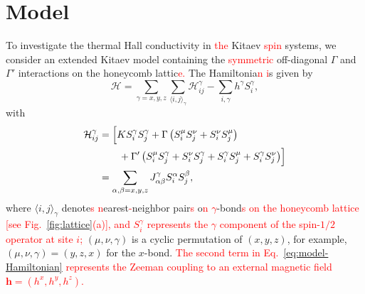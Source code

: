 \documentclass[twocolumn,superscriptaddress,showpacs, longbibliography, aps, prb]{revtex4-2}
\newcommand{\red}[1]{\textcolor{red}{#1}}
\newcommand{\blue}[1]{\textcolor{blue}{#1}}
\newcommand{\orange}[1]{\textcolor{orange}{#1}}
\begin{document}
\section{Model}
\label{sec:model}
To investigate the thermal Hall conductivity %
in \red{the} Kitaev \red{spin} systems, 
we consider an extended Kitaev model containing the \red{symmetric} off-diagonal $\Gamma$ and $\Gamma'$ interactions 
on the honeycomb lattic\red{e.} %
The Hamiltonia\red{n %
i}s given %
by
\begin{equation}
 \mathcal{H} = \sum_{\gamma = x,y,z} \sum_{\langle i,j \rangle_\gamma}\mathcal{H}_{ij}^\gamma -  \sum_{i,\gamma} h^\gamma S_i^\gamma,
 \label{eq:model-Hamiltonian}
\end{equation}
with
\begin{align}
 \mathcal{H}_{ij}^\gamma &= \Bigl[ K S_i^\gamma S_j^\gamma + \Gamma\left( S_i^\mu S_j^\nu + S_i^\nu S_j^\mu \right) \notag\\
&\qquad + \Gamma'\left( S_i^\mu S_j^\gamma + S_i^\nu S_j^\gamma + S_i^\gamma S_j^\mu + S_i^\gamma S_j^\nu \right) \Bigr]\\
&= \sum_{\alpha,\beta = x,y,z} J_{\alpha\beta}^\gamma S_i^\alpha S_j^\beta, 
\end{align}
where $\langle i,j\rangle_\gamma$ %
denote\red{s %
n}earest\red{-}neighbor pair\red{s} o\red{n %
$\gamma$}-bond\red{s on the honeycomb lattice [see Fig.~\ref{fig:lattice}(a)], and $S_i^\gamma$ represents the $\gamma$ component of the spin-$1/2$ operator at site $i$;} %
$(\mu, \nu, \gamma)$ %
is a cyclic permutation of $(x,y,z)$, for example,
$(\mu, \nu, \gamma)=(y,z,x)$ for the $x$-bond.
\red{The second term in Eq.~\eqref{eq:model-Hamiltonian} represents the Zeeman coupling to an external magnetic field $\bm{h} = (h^x, h^y, h^z)$.}

\end{document}
